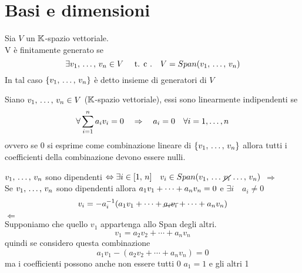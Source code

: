 \section{Basi e dimensioni}
\begin{defn}\bianco
Sia $V$ un $\mathbb{K}$-spazio vettoriale.\\
V  è finitamente generato se $$ \exists v_1, \, \dots , \, v_n \in V  \quad \text{ t. c .} \quad  V= Span( v_1, \, \dots , \, v_n ) $$
In tal caso $ \{v_1, \, \dots , \, v_n \} $ \`e detto insieme di generatori di $V$ 
\end{defn}
\spazio 
\begin{defn}  \bianco
Siano $v_1, \, \dots , \, v_n  \in V$ ($\mathbb{K}$-spazio vettoriale), essi sono linearmente indipendenti  se
$$ \forall \sum_{i=1}^n a_i v_i = 0 \quad \Rightarrow \quad a_i = 0 \quad \forall i=1, \dots ,n $$
ovvero se $0$ si esprime come combinazione lineare di $\{ v_1, \, \dots , \, v_n \} $ allora tutti i coefficienti della combinazione devono essere nulli. 
\end{defn}

\begin{prop} $ v_1, \, \dots , \, v_n$ sono dipendenti $\Leftrightarrow \exists i \in [ 1, \, n ] \quad v_i \in Span( v_1, \, \dots \, \cancel{v_i} \, \dots ,\, v_n ) $
\proof $ \Rightarrow $ \\
Se $v_1, \, \dots , \, v_n $ sono dipendenti allora $a_1 v_1 + \dots + a_n v_n =0 $ e $ \exists i \quad a_i\neq 0 $
$$ v_i=-a_i ^ { -1 } ( a_1 v_1 + \dots +  \cancel{ a_i v_i } + \dots + a_n v_n) $$
\proof $\Leftarrow $ \\
Supponiamo che quello $v_1 $ appartenga allo Span degli altri.
$$ v_1= a_2 v_2 + \cdots + a_n v_n $$
quindi se considero questa combinazione 
$$a_1 v_1 - ( a_2 v_2 +\cdots + a_n v_n )= 0 $$
ma i coefficienti possono anche non essere tutti 0 $ a_1=1 $ e gli altri 1 
\endproof
\end{prop}

